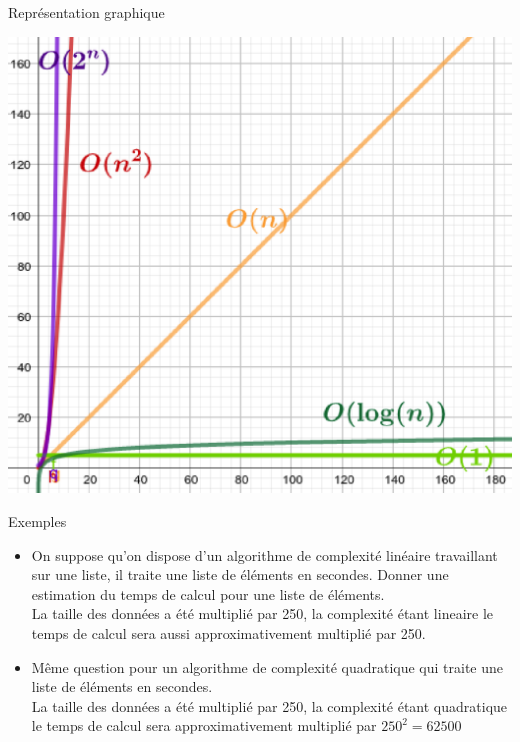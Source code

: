 \documentclass[10pt]{beamer}
\begin{document}
\begin{frame}
	\mframe{\DR}
	\begin{block}{Représentation graphique}
        \begin{center}
		\includegraphics[scale=0.4]{complexite.eps}
        \end{center}
	\end{block}
\end{frame}


\begin{frame}
	\mframe{\DR}
	\begin{exampleblock}{Exemples}
		\begin{itemize}
			\item<1-> On suppose qu'on dispose d'un algorithme de complexité linéaire travaillant sur une liste, il traite une liste de  éléments en  secondes. Donner une estimation du temps de calcul pour une liste de  éléments.\\
			      \onslide<2-> {\textcolor{OliveGreen}{La taille des données a été multiplié par 250, la complexité étant lineaire le temps de calcul sera aussi approximativement multiplié par 250. \\}}
			      \onslide<3->{\textcolor{OliveGreen}{$0.015 \times 250 = 3.75$, on peut donc prévoir un temps de calcul d'environ 3,75 secondes}}
			\item<4-> Même question pour un algorithme de complexité quadratique qui traite une liste de  éléments en  secondes.\\
			      \onslide<5-> {\textcolor{OliveGreen}{La taille des données a été multiplié par 250, la complexité étant quadratique le temps de calcul sera  approximativement multiplié par $250^2=62500$ \\}}
			      \onslide<6->{\textcolor{OliveGreen}{$0.07 \times 62\,500 = 4375$, on peut donc prévoir un temps de calcul d'environ $4\,375$ secondes, c'est à dire près d'une heure et 15 minutes !}}
		\end{itemize}
	\end{exampleblock}
\end{frame}
\end{document}
